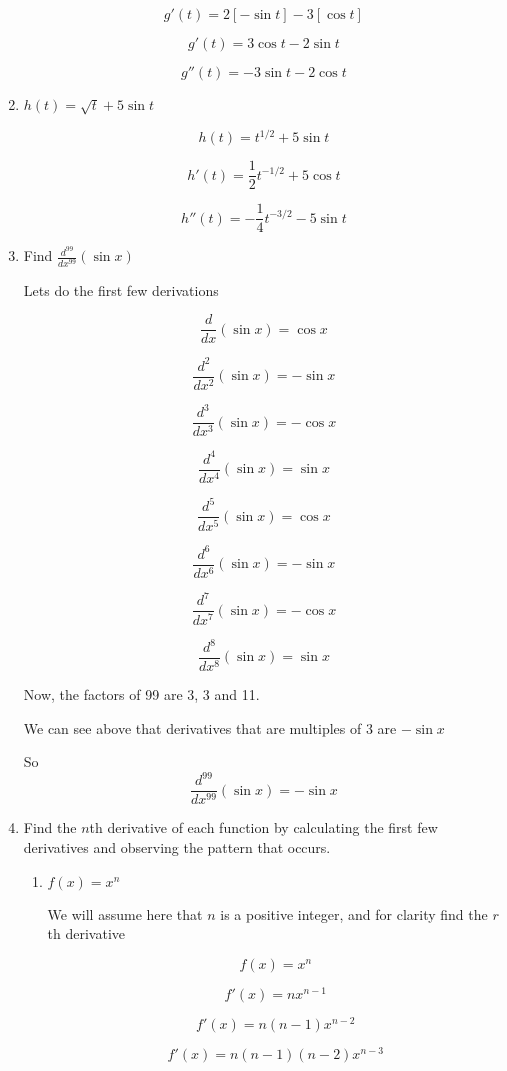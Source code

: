 \documentclass{article}
\begin{document}
\begin{enumerate}
			$$g'(t) = 2[-\sin t] - 3[\cos t]$$

			$$g'(t) = 3 \cos t - 2 \sin t$$

			$$g''(t) = - 3 \sin t - 2 \cos t$$

		\item $h(t) = \sqrt{t} + 5 \sin t$

			$$h(t) = t^{1/2} + 5\sin t$$

			$$h'(t) = \frac{1}{2} t^{-1/2} + 5 \cos t$$

			$$h''(t) = -\frac{1}{4} t^{-3/2} - 5 \sin t$$

		\item Find $\frac{d^{99}}{dx^{99}} (\sin x)$

			Lets do the first few derivations

			$$\frac{d}{dx} (\sin x) = \cos x$$

			$$\frac{d^{2}}{dx^{2}} (\sin x) = -\sin x$$

			$$\frac{d^{3}}{dx^{3}} (\sin x) = -\cos x$$

			$$\frac{d^{4}}{dx^{4}} (\sin x) = \sin x$$

			$$\frac{d^{5}}{dx^{5}} (\sin x) = \cos x$$

			$$\frac{d^{6}}{dx^{6}} (\sin x) = -\sin x$$

			$$\frac{d^{7}}{dx^{7}} (\sin x) = -\cos x$$

			$$\frac{d^{8}}{dx^{8}} (\sin x) = \sin x$$

			Now, the factors of 99 are 3, 3 and 11.

			We can see above that derivatives that are multiples
			of 3 are $-\sin x$

			So $$\frac{d^{99}}{dx^{99}} (\sin x) = -\sin x$$

		\item Find the $n$th derivative of each function by calculating the
			first few derivatives and observing the pattern that occurs.

		\begin{enumerate}
			\item $f(x) = x^{n}$

			We will assume here that $n$ is a positive integer, and for clarity find
			the $r$th derivative

			$$f(x) = x^{n}$$

			$$f'(x) = nx^{n-1}$$

			$$f'(x) = n(n-1)x^{n-2}$$

			$$f'(x) = n(n-1)(n-2)x^{n-3}$$


\end{enumerate}
\end{enumerate}
\end{document}
